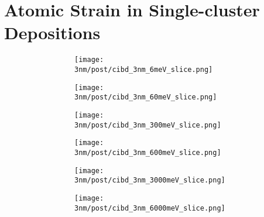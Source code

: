 \section{Atomic Strain in Single-cluster Depositions}
\begin{figure}[!h] \centering
	\captionsetup[subfigure]{justification=centering}
	\begin{subfigure}{0.5\linewidth} 
		\begin{subfigure}{0.33\linewidth} \centering %
			\texttt{[image: 3nm/post/cibd\_3nm\_6meV\_slice.png]} 
		\end{subfigure}%
		\begin{subfigure}{0.33\linewidth} \centering %
			\texttt{[image: 3nm/post/cibd\_3nm\_60meV\_slice.png]} 
		\end{subfigure}%
		\begin{subfigure}{0.33\linewidth} \centering	%
		\texttt{[image: 3nm/post/cibd\_3nm\_300meV\_slice.png]} 
		\end{subfigure}%
		\vfill
		\begin{subfigure}{0.33\linewidth} \centering %
		\texttt{[image: 3nm/post/cibd\_3nm\_600meV\_slice.png]} 
		\end{subfigure}%
		\begin{subfigure}{0.33\linewidth} \centering %
		\texttt{[image: 3nm/post/cibd\_3nm\_3000meV\_slice.png]} 
		\end{subfigure}%
		\begin{subfigure}{0.33\linewidth} \centering %
		\texttt{[image: 3nm/post/cibd\_3nm\_6000meV\_slice.png]} 
		\end{subfigure}
	\end{subfigure}%

\end{figure}
